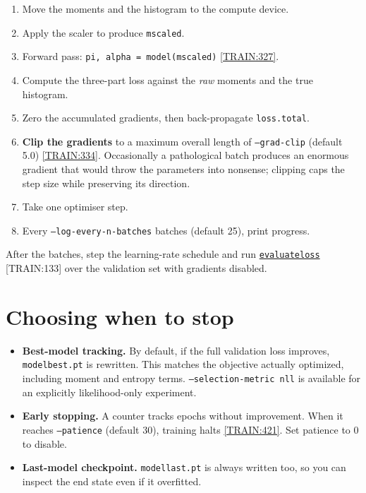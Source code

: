 \documentclass[11pt,a4paper]{report}
\newcommand{\srcbase}{vscode://file/Users/syellapa/Documents/Research/2026/ANSYS/Multi-ScalarPDF}
\newcommand{\dmdn}{dirichlet\string_mdn}
\newcommand{\srctag}[1]{{\footnotesize\textcolor{TagGray}{[#1]}}}
\newcommand{\Train}[2]{\href{\srcbase/\dmdn/train.py:#1}{\texttt{#2}}\,\srctag{TRAIN:#1}}
\newcommand{\TrainL}[1]{\href{\srcbase/\dmdn/train.py:#1}{\srctag{TRAIN:#1}}}
\newcommand{\code}[1]{\texttt{#1}}
\renewcommand{\_}{\origtextunderscore\allowbreak}
\begin{document}
\begin{enumerate}
  \item Move the moments and the histogram to the compute device.
  \item Apply the scaler to produce \code{m\_scaled}.
  \item Forward pass: \code{pi, alpha = model(m\_scaled)} \TrainL{327}.
  \item Compute the three-part loss against the \emph{raw} moments and the true histogram.
  \item Zero the accumulated gradients, then back-propagate \code{loss.total}.
  \item \textbf{Clip the gradients} to a maximum overall length of \code{--grad-clip}
        (default 5.0) \TrainL{334}. Occasionally a pathological batch produces an enormous
        gradient that would throw the parameters into nonsense; clipping caps the step size
        while preserving its direction.
  \item Take one optimiser step.
  \item Every \code{--log-every-n-batches} batches (default 25), print progress.
\end{enumerate}

After the batches, step the learning-rate schedule and run
\Train{133}{evaluate\_loss} over the validation set with gradients disabled.

\section{Choosing when to stop}

\begin{itemize}
  \item \textbf{Best-model tracking.} By default, if the full validation loss improves,
        \code{model\_best.pt} is rewritten. This matches the objective actually optimized,
        including moment and entropy terms. \code{--selection-metric nll} is available for an
        explicitly likelihood-only experiment.
  \item \textbf{Early stopping.} A counter tracks epochs without improvement. When it reaches
        \code{--patience} (default 30), training halts \TrainL{421}. Set patience to 0 to
        disable.
  \item \textbf{Last-model checkpoint.} \code{model\_last.pt} is always written too, so you can
        inspect the end state even if it overfitted.
\end{itemize}
\end{document}
